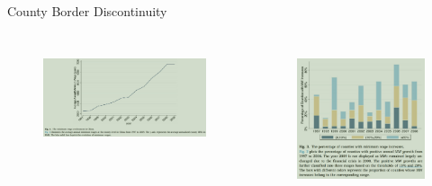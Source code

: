 \documentclass[aspectratio = 169]{beamer}
\begin{document}
    \begin{frame}{County Border Discontinuity}
        \begin{columns}
            \begin{figure}
                \centering
                \includegraphics[width = \textwidth, height = 0.6\textheight]{climate_change/beamer/wd}
                \label{fig:chinese-mw1}
            \end{figure}

            \begin{figure}
                \centering
                \includegraphics[width = \textwidth, height = 0.7\textheight]{climate_change/beamer/wd2}
                \label{fig:chinese-mw2}
            \end{figure}
        \end{columns}
    \end{frame}
\end{document}
